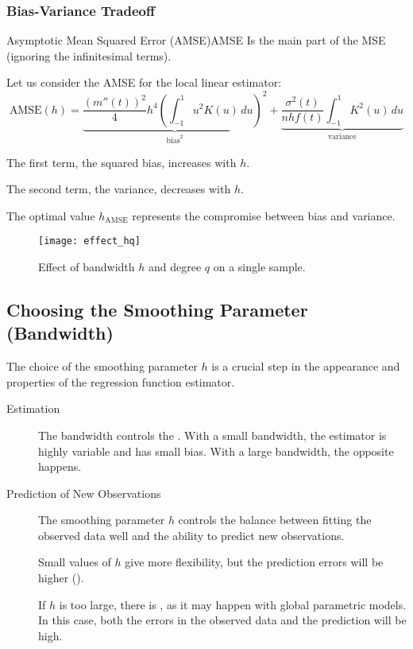 \subsubsection{Bias-Variance Tradeoff}
\begin{definition}{Asymptotic Mean Squared Error (AMSE)}{AMSE}
    Is the main part of the MSE (ignoring the infinitesimal terms).
\end{definition}

Let us consider the AMSE for the local linear estimator:
\begin{equation*}
    \text{AMSE}(h) = \underbrace{\frac{(m''(t))^2}{4}h^4 \left( \int_{-1}^1 u^2 K(u)\, du \right)^2}_{\text{bias}^2}
        + 
            \underbrace{\frac{\sigma^2(t)}{nhf(t)} \int_{-1}^1 K^2(u) \, du}_{\text{variance}}
\end{equation*}

The first term, the squared bias, increases with $h$.

The second term, the variance, decreases with $h$.

\begin{note}
The optimal value $h_{\text{AMSE}}$ represents the compromise between bias and variance.
\end{note}

\begin{figure}[H]
    \texttt{[image: effect\_hq]}
    \caption{Effect of bandwidth $h$ and degree $q$ on a single sample.}
\end{figure}

\subsection{Choosing the Smoothing Parameter (Bandwidth)}
The choice of the smoothing parameter $h$ is a crucial step in the appearance
and properties of the regression function estimator.

\begin{description}
    \item[Estimation]
The bandwidth controls the . With a small bandwidth,
the estimator is highly variable and has small bias. With a large bandwidth, the
opposite happens.
\item[Prediction of New Observations] The smoothing parameter $h$ controls the
    balance between fitting the observed data well and the ability to predict
    new observations.

    Small values of $h$ give more flexibility, but the prediction errors
    will be higher ().

    If $h$ is too large, there is , as it may happen with
    global parametric models. In this case, both the errors in the observed data
    and the prediction will be high.
\end{description}

